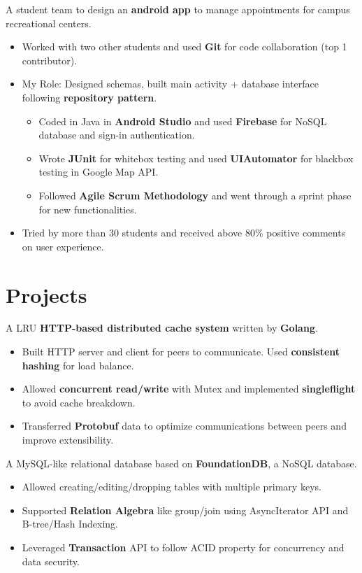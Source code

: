 \documentclass{resume}
\begin{document}
  A student team to design an \textbf{android app} to manage appointments for campus recreational centers.
\begin{itemize}
  \item Worked with two other students and used \textbf{Git} for code collaboration (top 1 contributor).
  \item My Role: Designed schemas, built main activity + database interface following \textbf{repository pattern}.
  \begin{itemize}
    \item Coded in Java in \textbf{Android Studio} and used \textbf{Firebase} for NoSQL database and sign-in authentication. 
    \item Wrote \textbf{JUnit} for whitebox testing and used \textbf{UIAutomator} for blackbox testing in Google Map API.
    \item Followed \textbf{Agile Scrum Methodology} and went through a sprint phase for new functionalities.
  \end{itemize}
  \item Tried by more than 30 students and received above 80\% positive comments on user experience.
\end{itemize}

\section{Projects}
  A LRU \textbf{HTTP-based distributed cache system} written by \textbf{Golang}.
\begin{itemize}
  \item Built HTTP server and client for peers to communicate. Used \textbf{consistent hashing} for load balance.
  \item Allowed \textbf{concurrent read/write} with Mutex and implemented \textbf{singleflight} to avoid cache breakdown.
  \item Transferred \textbf{Protobuf} data to optimize communications between peers and improve extensibility.
\end{itemize}

  A MySQL-like relational database based on \textbf{FoundationDB}, a NoSQL database.
\begin{itemize}
  \item Allowed creating/editing/dropping tables with multiple primary keys.
  \item Supported \textbf{Relation Algebra} like group/join using AsyncIterator API and B-tree/Hash Indexing.
  \item Leveraged \textbf{Transaction} API to follow ACID property for concurrency and data security.
\end{itemize}
\end{document}
